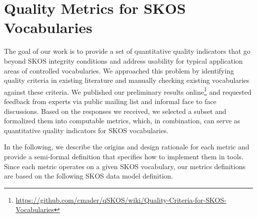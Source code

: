 
\section{Quality Metrics for SKOS Vocabularies}\label{sec:metrics}

The goal of our work is to provide a set of quantitative quality indicators that go beyond SKOS integrity conditions and address usability for typical application areas of controlled vocabularies. We approached this problem by identifying quality criteria in existing literature and manually checking existing vocabularies against these criteria. We published our preliminary results online\footnote{\url{https://github.com/cmader/qSKOS/wiki/Quality-Criteria-for-SKOS-Vocabularies}} and requested feedback from experts via public mailing list and informal face to face discussions. Based on the responses we received, we selected a subset  and formalized them into computable metrics, which, in combination, can serve as quantitative quality indicators for SKOS vocabularies.


In the following, we describe the origins and design rationale for each metric and provide a semi-formal definition that specifies how to implement them in tools. Since each metric operates on a given SKOS vocabulary, our metrics definitions are based on the following SKOS data model definition.

